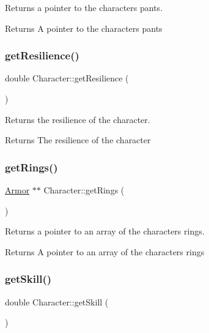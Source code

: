 Returns a pointer to the character\textquotesingle{}s pants. 

\begin{DoxyReturn}{Returns}
A pointer to the character\textquotesingle{}s pants 
\end{DoxyReturn}
\mbox{\label{class_character_a2fa72a1a71a2009ce3f41addd17b3ee8}} 
\subsubsection{\texorpdfstring{getResilience()}{getResilience()}}
{\footnotesize\ttfamily double Character\+::get\+Resilience (\begin{DoxyParamCaption}{ }\end{DoxyParamCaption})}



Returns the resilience of the character. 

\begin{DoxyReturn}{Returns}
The resilience of the character 
\end{DoxyReturn}
\mbox{\label{class_character_ac75aeb066ce431010649333f3b8fae79}} 
\subsubsection{\texorpdfstring{getRings()}{getRings()}}
{\footnotesize\ttfamily \mbox{\hyperlink{class_armor}{Armor}} $\ast$$\ast$ Character\+::get\+Rings (\begin{DoxyParamCaption}{ }\end{DoxyParamCaption})}



Returns a pointer to an array of the character\textquotesingle{}s rings. 

\begin{DoxyReturn}{Returns}
A pointer to an array of the character\textquotesingle{}s rings 
\end{DoxyReturn}
\mbox{\label{class_character_a646f45c59a8b2a5d48e7e83722ebeaa6}} 
\subsubsection{\texorpdfstring{getSkill()}{getSkill()}}
{\footnotesize\ttfamily double Character\+::get\+Skill (\begin{DoxyParamCaption}{ }\end{DoxyParamCaption})}



